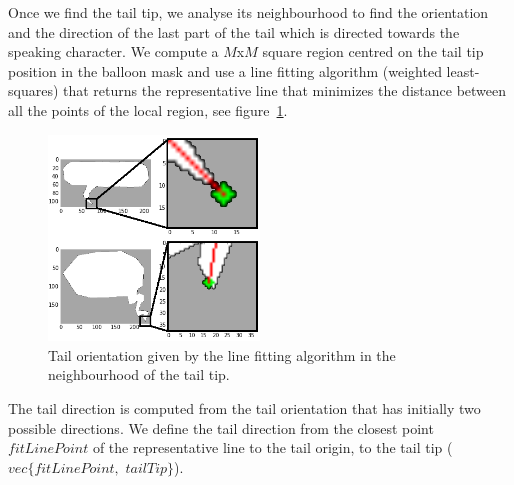 Once we find the tail tip, we analyse its neighbourhood to find the orientation and the direction of the last part of the tail which is directed towards the speaking character.
We compute a $M$x$M$ square region centred on the tail tip position in the balloon mask and use a line fitting algorithm (weighted least-squares) that returns the representative line that minimizes the distance between all the points of the local region, see figure~\ref{fig:se:orientation}.


    \begin{figure}[ht]%
      \centering
      \includegraphics[width=0.5\textwidth]{tail_direction.png}
    \caption{Tail orientation given by the line fitting algorithm in the neighbourhood of the tail tip.}
    \label{fig:se:orientation}
    \end{figure}  


The tail direction is computed from the tail orientation that has initially two possible directions.
We define the tail direction from the closest point $fitLinePoint$ of the representative line to the tail origin, to the tail tip ($vec\{fitLinePoint,$ $tailTip\}$).




